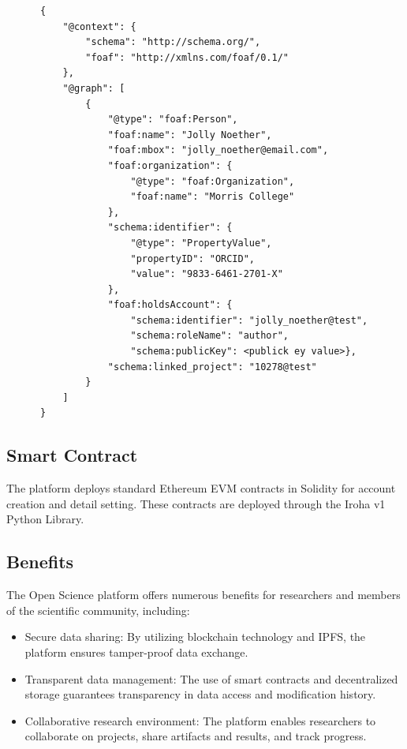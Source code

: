 \documentclass{article}
\begin{document}
\begin{verbatim}
      {
          "@context": {
              "schema": "http://schema.org/",
              "foaf": "http://xmlns.com/foaf/0.1/"
          },
          "@graph": [
              {
                  "@type": "foaf:Person",
                  "foaf:name": "Jolly Noether",
                  "foaf:mbox": "jolly_noether@email.com",
                  "foaf:organization": {
                      "@type": "foaf:Organization",
                      "foaf:name": "Morris College"
                  },
                  "schema:identifier": {
                      "@type": "PropertyValue",
                      "propertyID": "ORCID",
                      "value": "9833-6461-2701-X"
                  },
                  "foaf:holdsAccount": {
                      "schema:identifier": "jolly_noether@test",
                      "schema:roleName": "author",
                      "schema:publicKey": <publick ey value>},
                  "schema:linked_project": "10278@test"
              }
          ]
      }
      \end{verbatim}




\subsection{Smart Contract}

The platform deploys standard Ethereum EVM contracts in Solidity for account creation and detail setting. These contracts are deployed through the Iroha v1 Python Library.

\subsection{Benefits}

The Open Science platform offers numerous benefits for researchers and members of the scientific community, including:

\begin{itemize}
      \item Secure data sharing: By utilizing blockchain technology and IPFS, the platform ensures tamper-proof data exchange.
      \item Transparent data management: The use of smart contracts and decentralized storage guarantees transparency in data access and modification history.
      \item Collaborative research environment: The platform enables researchers to collaborate on projects, share artifacts and results, and track progress.
\end{itemize}
\end{document}
